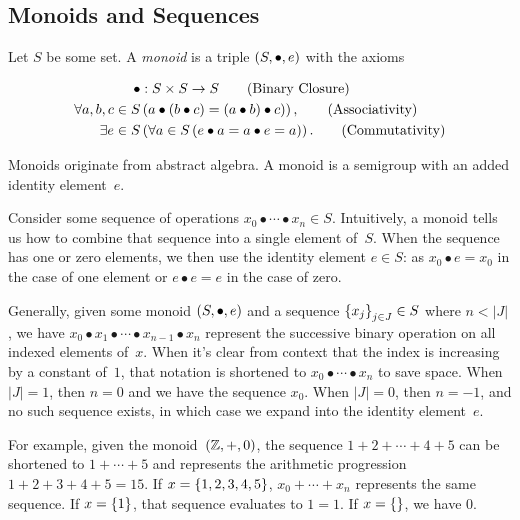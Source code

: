 \subsection{Monoids and Sequences}
\begin{definition}[Monoid]
  Let $S$ be some set.  A \emph{monoid} is a triple $\left({S},{\bullet},{e}\right)$
    with the axioms

  \begin{align}
    \bullet &: S\times S \rightarrow S
      \tag{Binary Closure} \\
    \Forall{a,b,c\in S&}{a\bullet(b\bullet c) = (a\bullet b)\bullet c)},
      \tag{Associativity} \\
    \Exists{e\in S&}{\Forall{a\in S}{e\bullet a = a\bullet e = a}}.
      \tag{Commutativity}
  \end{align}
\end{definition}

Monoids originate from abstract algebra.
A monoid is a semigroup with an added identity element~$e$.

Consider some sequence of operations
  $x_0 \bullet\cdots\bullet x_n \in S$.
Intuitively,
  a monoid tells us how to combine that sequence into a single element
  of~$S$.
When the sequence has one or zero elements,
  we then use the identity element $e\in S$:
    as $x_0 \bullet e = x_0$ in the case of one element
    or $e \bullet e = e$ in the case of zero.

\indexsym{}
Generally,
  given some monoid $\left({S},{\bullet},{e}\right)$ and a sequence $\left\{x_{j}\right\}_{j\in J}\in S$
  where $n<|J|$,
    we have
    $x_0\bullet x_1\bullet\cdots\bullet x_{n-1}\bullet x_n$
    represent the successive binary operation on all indexed elements
    of~$x$.
When it's clear from context that the index is increasing by a constant
  of~$1$,
    that notation is shortened to $x_0\bullet\cdots\bullet x_n$ to save
    space.
When $|J|=1$, then $n=0$ and we have the sequence $x_0$.
When $|J|=0$, then $n=-1$,
  and no such sequence exists,
  in which case we expand into the identity element~$e$.

For example,
  given the monoid~$\left({\mathbb{Z}},{+},{0}\right)$,
  the sequence $1+2+\cdots+4+5$ can be shortened to
    $1+\cdots+5$ and represents the arithmetic progression
    $1+2+3+4+5=15$.
If $x=\left\{1,2,3,4,5\right\}$,
  $x_0+\cdots+x_n$ represents the same sequence.
If $x=\left\{1\right\}$,
  that sequence evaluates to $1=1$.
If $x=\left\{\right\}$,
  we have $0$.

